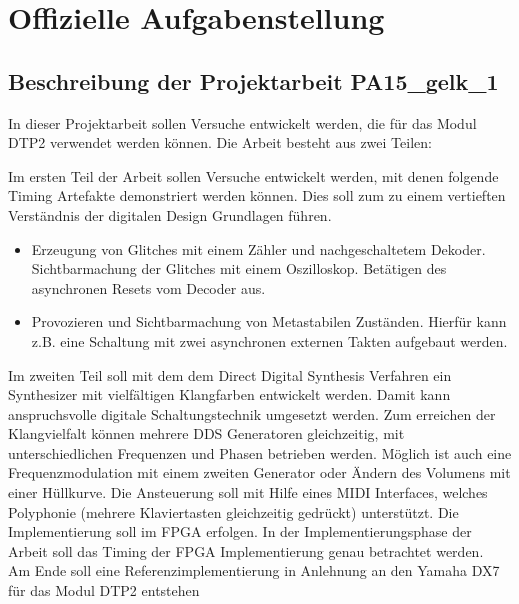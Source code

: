 

\appendix

\chapter{Offizielle Aufgabenstellung}\label{chap.anhang_aufgabenstellung}

\section*{Beschreibung der Projektarbeit PA15\_gelk\_1}\label{sect.aufgabenstellung}

In dieser Projektarbeit sollen Versuche entwickelt werden, die für das Modul DTP2 verwendet werden können. Die Arbeit besteht aus zwei Teilen:

Im ersten Teil der Arbeit sollen Versuche entwickelt werden, mit denen folgende Timing Artefakte demonstriert werden können. Dies soll zum zu einem vertieften Verständnis der digitalen Design Grundlagen führen.

\begin{itemize}
	\item Erzeugung von Glitches mit einem Zähler und nachgeschaltetem Dekoder. Sichtbarmachung der Glitches mit einem Oszilloskop. Betätigen des asynchronen Resets vom Decoder aus. 

	\item Provozieren und Sichtbarmachung von Metastabilen Zuständen. Hierfür kann z.B. eine Schaltung mit zwei asynchronen externen Takten aufgebaut werden. 
\end{itemize}

Im zweiten Teil soll mit dem dem Direct Digital Synthesis Verfahren ein Synthesizer mit vielfältigen Klangfarben entwickelt werden. Damit kann anspruchsvolle digitale Schaltungstechnik umgesetzt werden. Zum erreichen der Klangvielfalt können mehrere DDS Generatoren gleichzeitig, mit unterschiedlichen Frequenzen und Phasen betrieben werden. Möglich ist auch eine Frequenzmodulation mit einem zweiten Generator oder Ändern des Volumens mit einer Hüllkurve. Die Ansteuerung soll mit Hilfe eines MIDI Interfaces, welches Polyphonie (mehrere Klaviertasten gleichzeitig gedrückt) unterstützt. Die Implementierung soll im FPGA erfolgen. In der Implementierungsphase der Arbeit soll das Timing der FPGA Implementierung genau betrachtet werden.
\\[0.1cm]
Am Ende soll eine Referenzimplementierung in Anlehnung an den Yamaha DX7 für das Modul DTP2 entstehen 

